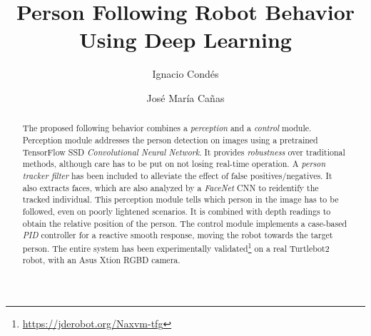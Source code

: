 \documentclass{svproc}
\begin{document}
\mainmatter              %
%
\title{Person Following Robot Behavior Using Deep Learning}
%
%
\author{Ignacio Condés \and José María Cañas}
%

%

\maketitle              %

\begin{abstract}
The proposed following behavior combines a \emph{perception} and a \emph{control} module. Perception module addresses the person detection on images using a pretrained TensorFlow SSD \emph{Convolutional Neural Network}. It provides \emph{robustness} over traditional methods, although care has to be put on not losing real-time operation. A \emph{person tracker filter} has been included to alleviate the effect of false positives/negatives. It also extracts faces, which are also analyzed by a \emph{FaceNet} CNN to reidentify the tracked individual. This perception module tells which person in the image has to be followed, even on poorly lightened scenarios. It is combined with depth readings to obtain the relative position of the person. The control module implements a case-based \emph{PID} controller for a reactive smooth response, moving the robot towards the target person. The entire system has been experimentally validated\footnote{\url{https://jderobot.org/Naxvm-tfg}} on a real Turtlebot2 robot, with an Asus Xtion RGBD camera.
\end{abstract}
%














\end{document}
